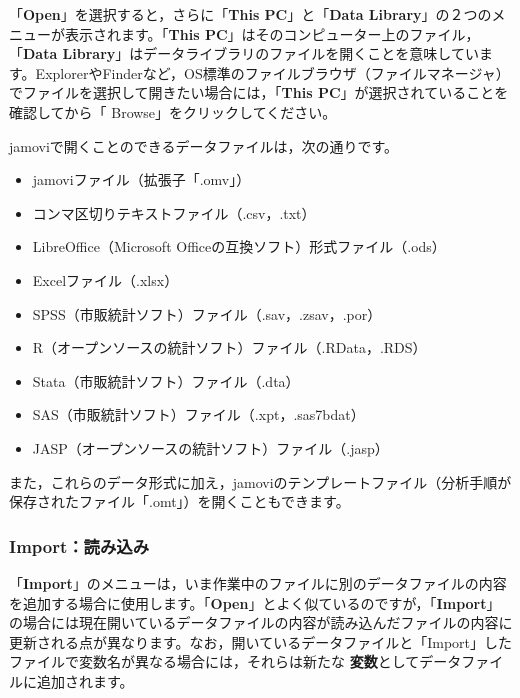\documentclass[
  12pt,
  a5jpaper,
  lualatex, ja=standard]{bxjsbook}
\providecommand{\tightlist}{%
  \setlength{\itemsep}{0pt}\setlength{\parskip}{0pt}}
\renewcommand{\emph}[1]{\textbf{\color{emph} #1}}
\newcommand{\infig}[1]{\raisebox{-.2\zh}{\texttt{[image: images/assets/\#1]}}}
\newenvironment{jmvblue}{%
	\begin{center}%
	\begin{tcolorbox}[%
		colframe=ao,
		colbacktitle=ao,
		colback=ao!2!white,
		breakable,
		width=.9\textwidth,
		]\small\addtolength{\leftmargini}{-3\labelsep}%
	}%
	{\end{tcolorbox}\end{center}}
\begin{document}
「\textbf{Open}」を選択すると，さらに「\textbf{This PC}」と「\textbf{Data Library}」の２つのメニューが表示されます。「\textbf{This PC}」はそのコンピューター上のファイル，「\textbf{Data Library}」はデータライブラリのファイルを開くことを意味しています。ExplorerやFinderなど，OS標準のファイルブラウザ（ファイルマネージャ）でファイルを選択して開きたい場合には，「\textbf{This PC}」が選択されていることを確認してから「\infig{place-browse.pdf} Browse」をクリックしてください。

jamoviで開くことのできるデータファイルは，次の通りです。

\begin{jmvblue}

\begin{itemize}
\tightlist
\item
  jamoviファイル（拡張子「.omv」）
\item
  コンマ区切りテキストファイル（.csv，.txt）
\item
  LibreOffice（Microsoft Officeの互換ソフト）形式ファイル（.ods）
\item
  Excelファイル（.xlsx）
\item
  SPSS（市販統計ソフト）ファイル（.sav，.zsav，.por）
\item
  R（オープンソースの統計ソフト）ファイル（.RData，.RDS）
\item
  Stata（市販統計ソフト）ファイル（.dta）
\item
  SAS（市販統計ソフト）ファイル（.xpt，.sas7bdat）
\item
  JASP（オープンソースの統計ソフト）ファイル（.jasp）
\end{itemize}

\end{jmvblue}

また，これらのデータ形式に加え，jamoviのテンプレートファイル（分析手順が保存されたファイル「.omt」）を開くこともできます。

\hypertarget{sec:intro-file-import}{%
\subsubsection*{Import：読み込み}\label{sec:intro-file-import}}

「\textbf{Import}」のメニューは，いま作業中のファイルに別のデータファイルの内容を追加する場合に使用します。「\textbf{Open}」とよく似ているのですが，「\textbf{Import}」の場合には現在開いているデータファイルの内容が読み込んだファイルの内容に更新される点が異なります。なお，開いているデータファイルと「Import」したファイルで変数名が異なる場合には，それらは新たな\emph{変数}としてデータファイルに追加されます。
\end{document}
